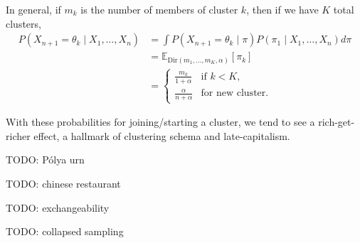 \documentclass[twoside]{article}
\newcommand{\Dir}{\mathrm{Dir}}
\newcommand{\todo}[1]{{\color{red} TODO: #1}}
\begin{document}
In general, if $m_k$ is the number of members of cluster $k$, then if we have $K$ total clusters,
\begin{align*}
   P(X_{n+1} = \theta_k \mid X_1,\ldots,X_n)
&= \int P(X_{n+1} = \theta_k \mid \pi) P(\pi_1 \mid X_1,\ldots,X_n) d\pi  \\
&= \mathbb{E}_{\Dir(m_1,\ldots,m_K,\alpha)}[\pi_k] \\
&= \begin{cases}
    \frac{m_k}{1+\alpha} & \text{if } k<K,\\
    \frac{\alpha}{n+\alpha} & \text{for new cluster}.
\end{cases}
\end{align*}

With these probabilities for joining/starting a cluster, we tend to see a rich-get-richer effect, a hallmark of clustering schema and late-capitalism.

\todo{P\'olya urn}

\todo{chinese restaurant}

\todo{exchangeability}

\todo{collapsed sampling}
\end{document}
